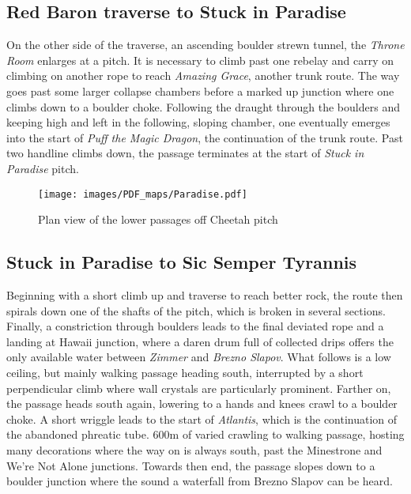 \subsection{Red Baron traverse to Stuck in Paradise}
On the other side of the traverse, an ascending boulder strewn tunnel, the \emph{Throne Room} enlarges at a pitch. It is necessary to climb past one rebelay and carry on climbing on another rope to reach \emph{Amazing Grace}, another trunk route. The way goes past some larger collapse chambers before a marked up junction where one climbs down to a boulder choke. Following the draught through the boulders and keeping high and left in the following, sloping chamber, one eventually emerges into the start of \emph{Puff the Magic Dragon}, the continuation of the trunk route. Past two handline climbs down, the passage terminates at the start of \emph{Stuck in Paradise} pitch.

\begin{figure*}[t!]
\checkoddpage \ifoddpage \forcerectofloat \else \forceversofloat \fi
\centering
\texttt{[image: images/PDF\_maps/Paradise.pdf]}
\caption{Plan view of the lower passages off Cheetah pitch}
\label{paradise}
\end{figure*}

\subsection{Stuck in Paradise to Sic Semper Tyrannis}
Beginning with a short climb up and traverse to reach better rock, the route then spirals down one of the shafts of the pitch, which is broken in several sections. Finally, a constriction through boulders leads to the final deviated rope and a landing at Hawaii junction, where a daren drum full of collected drips offers the only available water between \emph{Zimmer} and \emph{Brezno Slapov}. What follows is a low ceiling, but mainly walking passage heading south, interrupted by a short perpendicular climb where wall crystals are particularly prominent. Farther on, the passage heads south again, lowering to a hands and knees crawl to a boulder choke. A short wriggle leads to the start of \emph{Atlantis}, which is the continuation of the abandoned phreatic tube. 600m of varied crawling to walking passage, hosting many decorations  where the way on is always south, past the Minestrone and We're Not Alone junctions. Towards then end, the passage slopes down to a boulder junction where the sound a waterfall from Brezno Slapov can be heard. 

